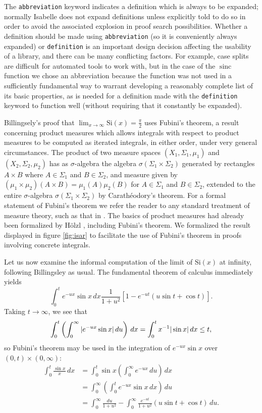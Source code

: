 \documentclass[leqno]{article}
\theoremstyle{definition}
\newcommand\sinc{\mathop{\text{sinc}}\nolimits}
\newcommand\Si{\text{Si}}
\begin{document}
\medskip

The \texttt{abbreviation} keyword indicates a definition which is always to be expanded; normally Isabelle does not expand definitions unless explicitly told to do so in order to avoid the associated explosion in proof search possibilities. Whether a definition should be made using \texttt{abbreviation} (so it is conveniently always expanded) or \texttt{definition} is an important design decision affecting the usability of a library, and there can be many conflicting factors. For example, case splits are difficult for automated tools to work with, but in the case of the $\sinc$ function we chose an abbreviation because the function was not used in a sufficiently fundamental way to warrant developing a reasonably complete list of its basic properties, as is needed for a definition made with the \texttt{definition} keyword to function well (without requiring that it constantly be expanded).

Billingsely's proof that $\lim_{x \rightarrow \infty} \Si(x) = \frac{\pi}{2}$ uses Fubini's theorem, a result concerning product measures which allows integrals with respect to product measures to be computed as iterated integrals, in either order, under very general circumstances. The product of two measure spaces $(X_1, \Sigma_1, \mu_1)$ and $(X_2, \Sigma_2, \mu_2)$ has as $\sigma$-algebra the algebra $\sigma(\Sigma_1 \times \Sigma_2)$ generated by rectangles $A \times B$ where $A \in \Sigma_1$ and $B \in \Sigma_2$, and measure given by $(\mu_1 \times \mu_2)(A \times B) = \mu_1(A)\mu_2(B)$ for $A \in \Sigma_1$ and $B \in \Sigma_2$, extended to the entire $\sigma$-algebra $\sigma(\Sigma_1 \times \Sigma_2)$ by Carath\'eodory's theorem. For a formal statement of Fubini's theorem we refer the reader to any standard treatment of measure theory, such as that in \cite{billingsley}. The basics of product measures had already been formalized by H\"olzl \cite{hoelzl-measure}, including Fubini's theorem. We formalized the result displayed in figure \ref{fig:isar} to facilitate the use of Fubini's theorem in proofs involving concrete integrals.

Let us now examine the informal computation of the limit of $\Si(x)$ at infinity, following Billingsley \cite{billingsley} as usual. The fundamental theorem of calculus immediately yields
\[ \int_0^t e^{-ux} \sin x \, dx \frac{1}{1+u^2}[1 - e^{-ut}(u \sin t + \cos t)]. \]
Taking $t \rightarrow \infty$, we see that
\[ \int_0^t \left( \int_0^\infty |e^{-ux} \sin x| \, du\right) \, dx = \int_0^t x^{-1} |\sin x| \, dx \le t, \]
\newpage
so Fubini's theorem may be used in the integration of $e^{-ux} \sin x$ over $(0,t) \times (0, \infty)$:
\begin{align*}
\int_0^t \frac{\sin x}{x} \, dx &= \int_0^t \sin x \left(\int_0^\infty e^{-ux} \, du\right) \, dx \\
                                &= \int_0^\infty \left(\int_0^t e^{-ux} \sin x \, dx\right) \, du \\
                                &= \int_0^\infty \frac{du}{1+u^2} - \int_0^\infty \frac{e^{-ut}}{1+u^2} (u \sin t + \cos t) \, du.
\end{align*}
\end{document}
